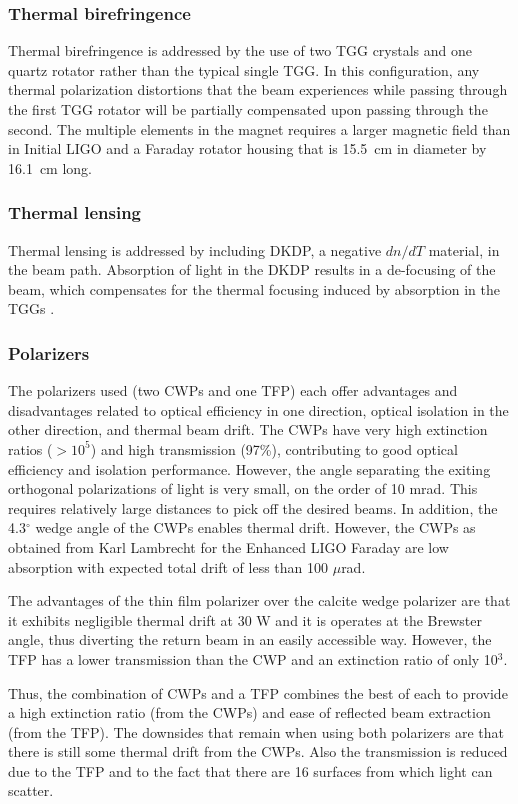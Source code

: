 \subsubsection{Thermal birefringence} 
Thermal birefringence is addressed by the use of two TGG crystals and
one quartz rotator rather than the typical single TGG. In this
configuration, any thermal polarization distortions that the beam
experiences while passing through the first TGG rotator will be
partially compensated upon passing through the second. The multiple
elements in the magnet requires a larger magnetic field than in Initial
LIGO and a Faraday
rotator housing that is 15.5~cm in diameter by 16.1~cm long.

\subsubsection{Thermal lensing}  
Thermal lensing is addressed by including DKDP, a negative $dn/dT$
material, in the beam path. Absorption of light in the DKDP results in
a de-focusing of the beam, which compensates for the thermal focusing
induced by absorption in the TGGs \cite{Khazanov2004Compensation}.

\subsubsection{Polarizers}  
The polarizers used (two CWPs and one TFP) each offer advantages and
disadvantages related to optical efficiency in one direction, optical
isolation in the other direction, and thermal beam drift. The CWPs
have very high extinction ratios ($>10^5$) and high transmission
(97\%), contributing to good optical efficiency and isolation
performance. However, the angle separating the exiting orthogonal
polarizations of light is very small, on the order of 10 mrad. This
requires relatively large distances to pick off the desired beams. In
addition, the 4.3$^{\circ}$ wedge angle of the CWPs enables thermal
drift. However, the CWPs as obtained from Karl Lambrecht for the
Enhanced LIGO Faraday are low absorption with expected total drift of
less than 100 $\mu$rad.

The advantages of the thin film polarizer over the calcite wedge
polarizer are that it exhibits negligible thermal drift at 30 W and it
is operates at the Brewster angle, thus diverting the return beam in
an easily accessible way. However, the TFP has a lower transmission
than the CWP and an extinction ratio of only 10$^3$. 

Thus, the combination of CWPs and a TFP combines the best of each to provide
a high extinction ratio (from the CWPs) and ease of reflected beam
extraction (from the TFP). The downsides that remain when using both
polarizers are that there is still some thermal drift from the
CWPs. Also the transmission is reduced due to the TFP and to the
fact that there are 16 surfaces from which light can scatter. 

